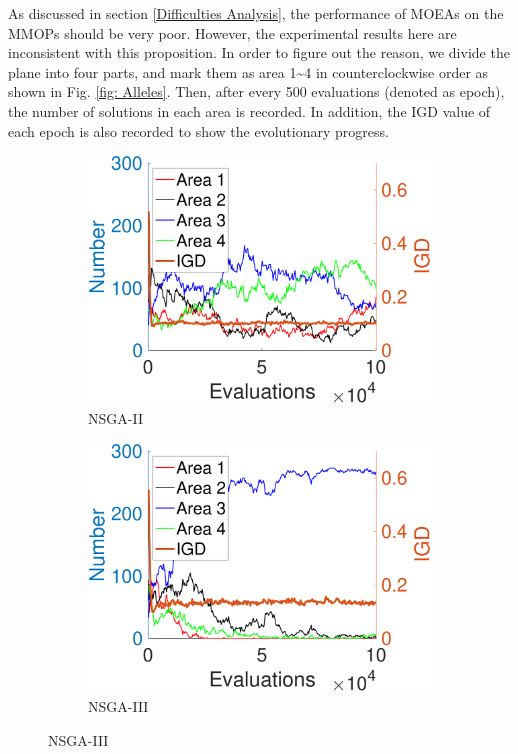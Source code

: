 \documentclass[conference]{IEEEtran}
\begin{document}
As discussed in section \ref{Difficulties Analysis}, the performance of MOEAs on the MMOPs should be very poor. However, the experimental results here are inconsistent with this proposition. In order to figure out the reason, we divide the plane into four parts, and mark them as area 1\textasciitilde 4 in counterclockwise order as shown in Fig. \ref{fig: Alleles}. Then, after every 500 evaluations (denoted as epoch), the number of solutions in each area is recorded. In addition, the IGD value of each epoch is also recorded to show the evolutionary progress. 

\begin{figure}[htbp]
    \centering
    \begin{subfigure}[b]{.24\textwidth}
    \includegraphics[width=\linewidth]{Section5/dim2/Diversity/NSGAII}
    \caption{NSGA-II}
    \end{subfigure}
    \begin{subfigure}[b]{.24\textwidth}
    \includegraphics[width=\linewidth]{Section5/dim2/Diversity/NSGAIII}
    \caption{NSGA-III}
    \label{fig: NSGA-III Diversity dim=2}
    

\end{subfigure}
\end{figure}
\end{document}
